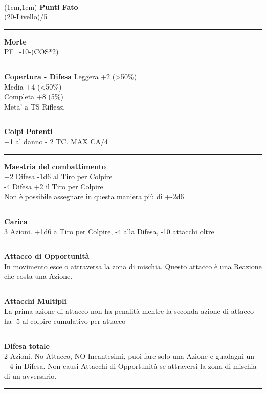 \documentclass[a4paper,12 pt,openany]{book}
\newcommand{\riga}{\rule{\textwidth}{0.4pt}}
\begin{document}
~\newpage

\begin{textblock*}{4cm}(1cm,1cm) %
{\textbf{Punti Fato}\\
(20-Livello)/5}

\riga

{\textbf{Morte}\\
PF=-10-(COS*2)}

\riga

\textbf{Copertura - Difesa}
Leggera +2 (>50\%)\\
Media +4 (<50\%)\\
Completa +8 (5\%)\\
Meta' a TS Riflessi

\riga

\textbf{Colpi Potenti}\\
+1 al danno - 2 TC. MAX CA/4

\riga

\textbf{Maestria del combattimento}\\
+2 Difesa -1d6 al Tiro per Colpire\\
-4 Difesa +2 il Tiro per Colpire \\
Non è possibile assegnare in questa maniera più di +-2d6.

\riga

\textbf{Carica}\\
3 Azioni. +1d6 a Tiro per Colpire, -4 alla Difesa, -10 attacchi oltre

\riga

\textbf{Attacco di Opportunità}\\
In movimento esce o attraversa la zona di mischia. Questo attacco è una Reazione che costa una Azione.

\riga

\textbf{Attacchi Multipli}\\
La prima azione di attacco non ha penalità mentre la seconda azione di attacco ha -5 al colpire cumulativo per attacco

\riga

\textbf{Difesa totale}\\
2 Azioni. No Attacco, NO Incantesimi, puoi fare solo una Azione e guadagni un +4 in Difesa. Non causi Attacchi di Opportunità se attraversi la zona di mischia di un avversario.

\riga


\end{textblock*}
\end{document}
